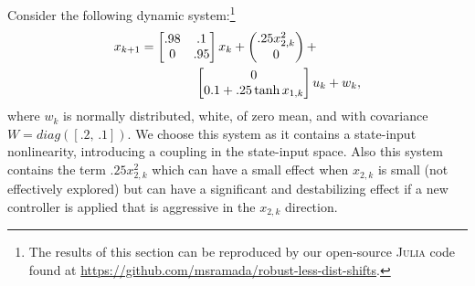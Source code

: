 \documentclass[letterpaper, 10 pt, conference]{ieeeconf}
\begin{document}
Consider the following dynamic system:\footnote{The results of this section can be reproduced by our open-source \textsc{Julia} code found at \href{https://github.com/msramada/robust-less-dist-shifts}{https://github.com/msramada/robust-less-dist-shifts}.} 
\begin{equation}
\begin{aligned} \label{eq:example dynamic system}
    x_{k+1} &= 
    \begin{bmatrix}
        .98& .1\\
        0& .95
    \end{bmatrix}x_k + 
    \begin{pmatrix}
        .25 x_{2,k}^2\\
        0
    \end{pmatrix} + \\
    &\hskip 15mm
    \begin{bmatrix}
        0\\
        0.1 + .25 \tanh{x_{1,k}}
    \end{bmatrix}u_k + w_k,
\end{aligned}
\end{equation}
where $w_k$ is normally distributed, white, of zero mean, and with covariance $W=diag(\left [ .2,\, .1\right])$. We choose this system as it contains a state-input nonlinearity, introducing a coupling in the state-input space. Also this system contains the term $.25 x_{2,k}^2$ which can have a small effect when $x_{2,k}$ is small (not effectively explored) but can have a significant and destabilizing effect if a new controller is applied that is aggressive in the $x_{2,k}$ direction.
\end{document}
